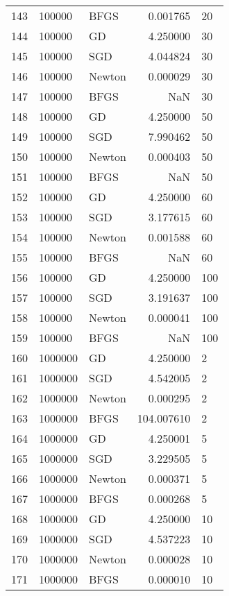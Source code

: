 \begin{tabular}{lllrl}
143 &   100000 &    BFGS &    0.001765 &     20 \\
144 &   100000 &      GD &    4.250000 &     30 \\
145 &   100000 &     SGD &    4.044824 &     30 \\
146 &   100000 &  Newton &    0.000029 &     30 \\
147 &   100000 &    BFGS &         NaN &     30 \\
148 &   100000 &      GD &    4.250000 &     50 \\
149 &   100000 &     SGD &    7.990462 &     50 \\
150 &   100000 &  Newton &    0.000403 &     50 \\
151 &   100000 &    BFGS &         NaN &     50 \\
152 &   100000 &      GD &    4.250000 &     60 \\
153 &   100000 &     SGD &    3.177615 &     60 \\
154 &   100000 &  Newton &    0.001588 &     60 \\
155 &   100000 &    BFGS &         NaN &     60 \\
156 &   100000 &      GD &    4.250000 &    100 \\
157 &   100000 &     SGD &    3.191637 &    100 \\
158 &   100000 &  Newton &    0.000041 &    100 \\
159 &   100000 &    BFGS &         NaN &    100 \\
160 &  1000000 &      GD &    4.250000 &      2 \\
161 &  1000000 &     SGD &    4.542005 &      2 \\
162 &  1000000 &  Newton &    0.000295 &      2 \\
163 &  1000000 &    BFGS &  104.007610 &      2 \\
164 &  1000000 &      GD &    4.250001 &      5 \\
165 &  1000000 &     SGD &    3.229505 &      5 \\
166 &  1000000 &  Newton &    0.000371 &      5 \\
167 &  1000000 &    BFGS &    0.000268 &      5 \\
168 &  1000000 &      GD &    4.250000 &     10 \\
169 &  1000000 &     SGD &    4.537223 &     10 \\
170 &  1000000 &  Newton &    0.000028 &     10 \\
171 &  1000000 &    BFGS &    0.000010 &     10 \\

\end{tabular}
